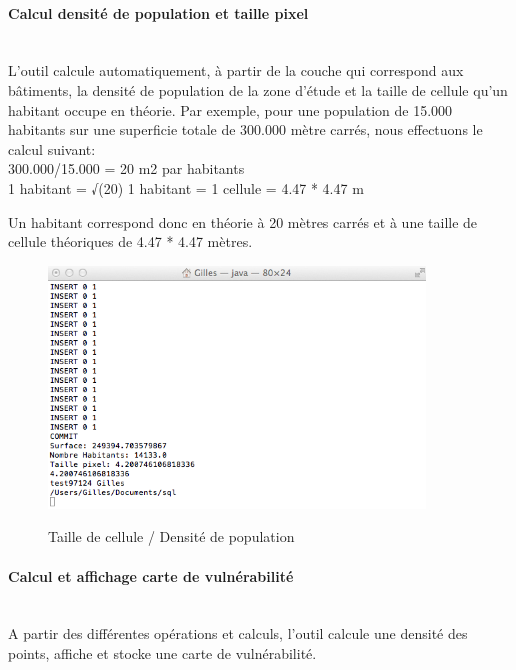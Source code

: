 \paragraph{Calcul densité de population et taille pixel\\\\}

L'outil calcule automatiquement, à partir de la couche qui correspond aux bâtiments, la densité de population de la zone d'étude et la taille de cellule qu'un habitant occupe en théorie. Par exemple, pour une population de 15.000 habitants sur une superficie totale de 300.000 mètre carrés, nous effectuons le calcul suivant: \\

300.000/15.000 = 20 m2 par habitants\\
1 habitant = √(20)
1 habitant = 1 cellule = 4.47 * 4.47 m

Un habitant correspond donc en théorie à 20 mètres carrés et à une taille de cellule théoriques de 4.47 * 4.47 mètres.\\


\begin{figure}[H]
\begin{center}
\includegraphics[width=10cm]{Chaine6}\\
\caption{\label{Chaine6} Taille de cellule / Densité de population}
\end{center}
\end{figure}

\paragraph{Calcul et affichage carte de vulnérabilité\\\\}

A partir des différentes opérations et calculs, l'outil calcule une densité des points, affiche et stocke une carte de vulnérabilité.\\

